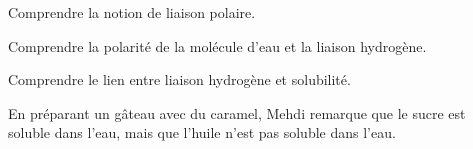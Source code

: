 \tetePremStssBiom

\vspace*{-30pt}


\begin{objectifs}
  \item Comprendre la notion de liaison polaire.
  \item Comprendre la polarité de la molécule d'eau et la liaison hydrogène.
  \item Comprendre le lien entre liaison hydrogène et solubilité.
\end{objectifs}

\begin{contexte}
  En préparant un gâteau avec du caramel, Mehdi remarque que le sucre est soluble dans l'eau, mais que l'huile n'est pas soluble dans l'eau.
  
\end{contexte}


